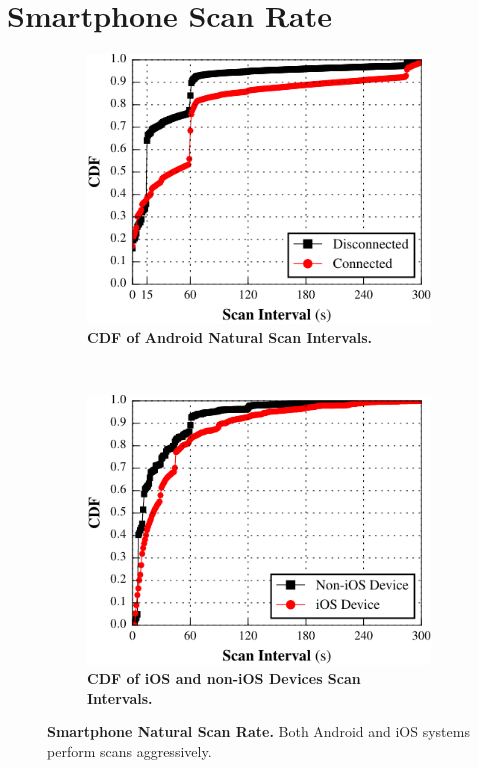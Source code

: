 \section{Smartphone Scan Rate}
\label{sec:scan}

\begin{figure}[t!]
  \centering
  \begin{subfigure}[t]{\columnwidth}
    \includegraphics[width=\textwidth]{./figures/ScanIntervalGraph.pdf}
    \caption{\textbf{CDF of Android Natural Scan Intervals.}}
    \label{fig:android_interval}
  \end{subfigure}\\
  \begin{subfigure}[t]{\columnwidth}
    \includegraphics[width=\textwidth]{./figures/NDScanInterval.pdf}
    \caption{\textbf{CDF of iOS and non-iOS Devices Scan Intervals.}}
    \label{fig:ios_interval}
  \end{subfigure}
\caption{\textbf{Smartphone Natural Scan Rate.} Both Android and iOS systems perform
\wifi{} scans aggressively.}
  \label{fig:intervals}
  \vspace*{\aftercaptiongap}
\end{figure}

